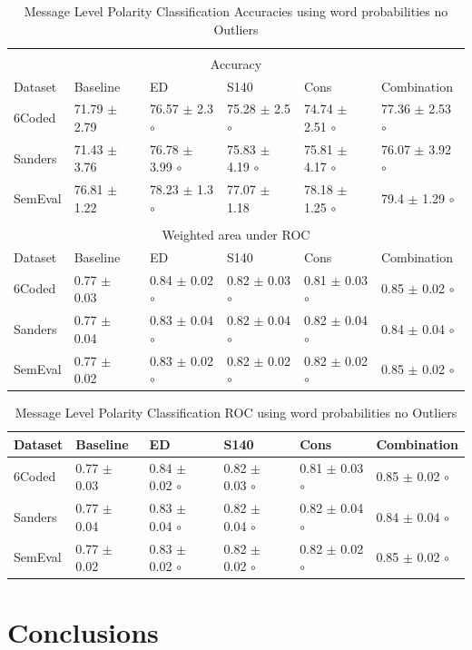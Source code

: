 \documentclass{sig-alternate}
\begin{document}
\begin{table}[htbp]
\begin{center}
\begin{tabular}{|l|l|l|l|l|l|}
\hline
\multicolumn{ 6}{|c|}{} \\ 
\multicolumn{ 6}{|c|}{Accuracy } \\ \hline
Dataset & Baseline & ED & S140 & Cons & Combination \\ \hline
6Coded & 71.79 $\pm$ 2.79 & 76.57 $\pm$ 2.3 $\circ$ & 75.28 $\pm$ 2.5 $\circ$ & 74.74 $\pm$ 2.51 $\circ$ & 77.36 $\pm$ 2.53 $\circ$ \\ 
Sanders & 71.43 $\pm$ 3.76 & 76.78 $\pm$ 3.99 $\circ$ & 75.83 $\pm$ 4.19 $\circ$ & 75.81 $\pm$ 4.17 $\circ$ & 76.07 $\pm$ 3.92 $\circ$ \\ 
SemEval & 76.81 $\pm$ 1.22 & 78.23 $\pm$ 1.3 $\circ$ & 77.07 $\pm$ 1.18 & 78.18 $\pm$ 1.25 $\circ$ & 79.4 $\pm$ 1.29 $\circ$ \\ \hline
\multicolumn{ 6}{|c|}{} \\ 
\multicolumn{ 6}{|c|}{Weighted area under ROC } \\ \hline
Dataset & Baseline & ED & S140 & Cons & Combination \\ \hline
6Coded & 0.77 $\pm$ 0.03 & 0.84 $\pm$ 0.02 $\circ$ & 0.82 $\pm$ 0.03 $\circ$ & 0.81 $\pm$ 0.03 $\circ$ & 0.85 $\pm$ 0.02 $\circ$ \\ 
Sanders & 0.77 $\pm$ 0.04 & 0.83 $\pm$ 0.04 $\circ$ & 0.82 $\pm$ 0.04 $\circ$ & 0.82 $\pm$ 0.04 $\circ$ & 0.84 $\pm$ 0.04 $\circ$ \\ 
SemEval & 0.77 $\pm$ 0.02 & 0.83 $\pm$ 0.02 $\circ$ & 0.82 $\pm$ 0.02 $\circ$ & 0.82 $\pm$ 0.02 $\circ$ & 0.85 $\pm$ 0.02 $\circ$ \\ \hline
\end{tabular}
\end{center}
\caption{Message Level Polarity Classification Accuracies using word probabilities no Outliers}
\label{}
\end{table}


\begin{table}[htbp]
\begin{center}
\begin{tabular}{|l|l|l|l|l|l|}
\hline
Dataset & Baseline & ED & S140 & Cons & Combination \\ \hline
6Coded & 0.77 $\pm$ 0.03 & 0.84 $\pm$ 0.02 $\circ$ & 0.82 $\pm$ 0.03 $\circ$ & 0.81 $\pm$ 0.03 $\circ$ & 0.85 $\pm$ 0.02 $\circ$ \\ 
Sanders & 0.77 $\pm$ 0.04 & 0.83 $\pm$ 0.04 $\circ$ & 0.82 $\pm$ 0.04 $\circ$ & 0.82 $\pm$ 0.04 $\circ$ & 0.84 $\pm$ 0.04 $\circ$ \\ 
SemEval & 0.77 $\pm$ 0.02 & 0.83 $\pm$ 0.02 $\circ$ & 0.82 $\pm$ 0.02 $\circ$ & 0.82 $\pm$ 0.02 $\circ$ & 0.85 $\pm$ 0.02 $\circ$ \\ \hline
\end{tabular}
\end{center}
\caption{Message Level Polarity Classification ROC using word probabilities no Outliers}
\label{}
\end{table}



\section{Conclusions}\label{sec:conc}




\end{document}
